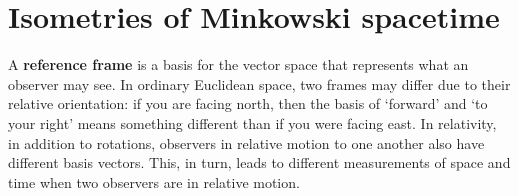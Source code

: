 \section{Isometries of Minkowski spacetime}\label{sec:Lorentz:transformations}


A \textbf{reference frame} is a basis for the vector space that represents what an observer may see. In ordinary Euclidean space, two frames may differ due to their relative orientation: if you are facing north, then the basis of `forward' and `to your right' means something different than if you were facing east. In relativity, in addition to rotations, observers in relative motion to one another also have different basis vectors. This, in turn, leads to different measurements of space and time when two observers are in relative motion.

